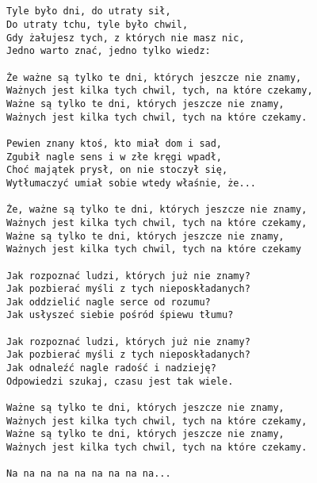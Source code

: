 \documentclass[12pt]{article}
\begin{document}
\subsection*{}
\begin{verbatim}
Tyle było dni, do utraty sił,
Do utraty tchu, tyle było chwil,
Gdy żałujesz tych, z których nie masz nic,
Jedno warto znać, jedno tylko wiedz:

Że ważne są tylko te dni, których jeszcze nie znamy,
Ważnych jest kilka tych chwil, tych, na które czekamy,
Ważne są tylko te dni, których jeszcze nie znamy,
Ważnych jest kilka tych chwil, tych na które czekamy.

Pewien znany ktoś, kto miał dom i sad,
Zgubił nagle sens i w złe kręgi wpadł,
Choć majątek prysł, on nie stoczył się,
Wytłumaczyć umiał sobie wtedy właśnie, że...

Że, ważne są tylko te dni, których jeszcze nie znamy,
Ważnych jest kilka tych chwil, tych na które czekamy,
Ważne są tylko te dni, których jeszcze nie znamy,
Ważnych jest kilka tych chwil, tych na które czekamy

Jak rozpoznać ludzi, których już nie znamy?
Jak pozbierać myśli z tych nieposkładanych?
Jak oddzielić nagle serce od rozumu?
Jak usłyszeć siebie pośród śpiewu tłumu?

Jak rozpoznać ludzi, których już nie znamy?
Jak pozbierać myśli z tych nieposkładanych?
Jak odnaleźć nagle radość i nadzieję?
Odpowiedzi szukaj, czasu jest tak wiele.

Ważne są tylko te dni, których jeszcze nie znamy,
Ważnych jest kilka tych chwil, tych na które czekamy,
Ważne są tylko te dni, których jeszcze nie znamy,
Ważnych jest kilka tych chwil, tych na które czekamy.

Na na na na na na na na na...
\end{verbatim}
\clearpage
\end{document}
